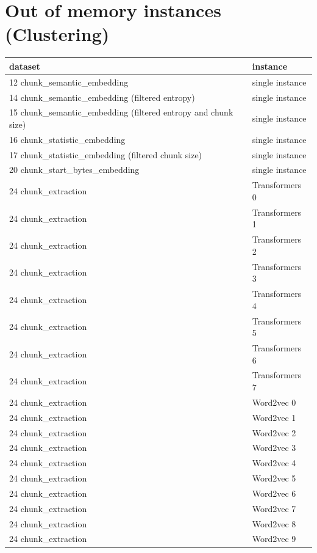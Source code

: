 \section{Out of memory instances (Clustering)}

\label{sec:annexe:out_of_memory_instances_clustering}

\begin{table}[H]
\centering
\begin{tabular}{ll}
\hline
dataset & instance \\ 
\hline
12 chunk\_semantic\_embedding & single instance \\ 
14 chunk\_semantic\_embedding (filtered entropy) & single instance \\ 
15 chunk\_semantic\_embedding (filtered entropy and chunk size) & single instance \\ 
16 chunk\_statistic\_embedding & single instance \\ 
17 chunk\_statistic\_embedding (filtered chunk size) & single instance \\ 
20 chunk\_start\_bytes\_embedding & single instance \\ 
24 chunk\_extraction & Transformers 0 \\ 
24 chunk\_extraction & Transformers 1 \\ 
24 chunk\_extraction & Transformers 2 \\ 
24 chunk\_extraction & Transformers 3 \\ 
24 chunk\_extraction & Transformers 4 \\ 
24 chunk\_extraction & Transformers 5 \\ 
24 chunk\_extraction & Transformers 6 \\ 
24 chunk\_extraction & Transformers 7 \\ 
24 chunk\_extraction & Word2vec 0 \\ 
24 chunk\_extraction & Word2vec 1 \\ 
24 chunk\_extraction & Word2vec 2 \\ 
24 chunk\_extraction & Word2vec 3 \\ 
24 chunk\_extraction & Word2vec 4 \\ 
24 chunk\_extraction & Word2vec 5 \\ 
24 chunk\_extraction & Word2vec 6 \\ 
24 chunk\_extraction & Word2vec 7 \\ 
24 chunk\_extraction & Word2vec 8 \\ 
24 chunk\_extraction & Word2vec 9 \\ 

\end{tabular}
\end{table}
